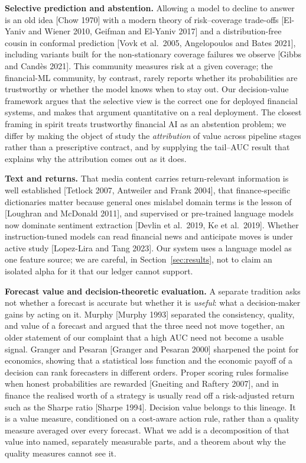 \documentclass[10pt, a4paper, oneside]{article}
\theoremstyle{definition}
\theoremstyle{plain}
\begin{document}
\noindent\textbf{Selective prediction and abstention.}
Allowing a model to decline to answer is an old idea [Chow 1970] with a modern
theory of risk--coverage trade-offs [El-Yaniv and Wiener 2010, Geifman and El-Yaniv
2017] and a distribution-free cousin in conformal prediction [Vovk et al.\ 2005,
Angelopoulos and Bates 2021], including variants built for the non-stationary
coverage failures we observe [Gibbs and Cand\`es 2021]. This community measures
risk at a given coverage; the financial-ML community, by contrast, rarely reports
whether its probabilities are trustworthy or whether the model knows when to stay
out. Our decision-value framework argues that the selective
view is the correct one for deployed financial systems, and makes that argument
quantitative on a real deployment. The closest framing in spirit treats trustworthy financial AI as an
abstention problem; we differ by making the object of study the \emph{attribution}
of value across pipeline stages rather than a prescriptive contract, and by
supplying the tail--AUC result that explains why the attribution comes out as it
does.

\noindent\textbf{Text and returns.}
That media content carries return-relevant information is well established
[Tetlock 2007, Antweiler and Frank 2004], that finance-specific dictionaries matter
because general ones mislabel domain terms is the lesson of [Loughran and McDonald
2011], and supervised or pre-trained language models now dominate sentiment
extraction [Devlin et al.\ 2019, Ke et al.\ 2019]. Whether instruction-tuned models
can read financial news and anticipate moves is under active study [Lopez-Lira and
Tang 2023]. Our system uses a language model as one feature source; we are careful,
in Section~\ref{sec:results}, not to claim an isolated alpha for it that our ledger
cannot support.

\noindent\textbf{Forecast value and decision-theoretic evaluation.}
A separate tradition asks not whether a forecast is accurate but whether it is
\emph{useful}: what a decision-maker gains by acting on it. Murphy [Murphy 1993]
separated the consistency, quality, and value of a forecast and argued that the three
need not move together, an older statement of our complaint that a high AUC need not
become a usable signal. Granger and Pesaran [Granger and Pesaran 2000] sharpened the
point for economics, showing that a statistical loss function and the economic payoff
of a decision can rank forecasters in different orders. Proper scoring rules formalise
when honest probabilities are rewarded [Gneiting and Raftery 2007], and in finance the
realised worth of a strategy is usually read off a risk-adjusted return such as the
Sharpe ratio [Sharpe 1994]. Decision value belongs to this lineage. It is a value
measure, conditioned on a cost-aware action rule, rather than a quality measure
averaged over every forecast. What we add is a decomposition of that value into named,
separately measurable parts, and a theorem about why the quality measures cannot see
it.
\end{document}
